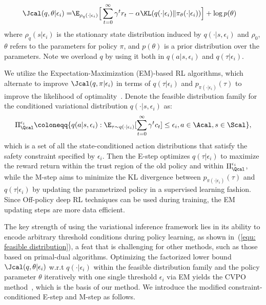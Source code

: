 \begin{equation}
\begin{split}
    \Jcal(q,\theta | \epsilon_i) =&
    \E_{\rho_q(\cdot |\epsilon_i)} \Big[ \sum_{t=0}^\infty \gamma^t r_t - \alpha\KL(q(\cdot | \epsilon_i) \Vert \pi_\theta(\cdot | \epsilon_i))\Big] + \log p(\theta)
\end{split}
\label{eq:elbo_new}
\end{equation}
where $\rho_q(s | \epsilon_i)$ is the stationary state distribution induced by $q(\cdot|s, \epsilon_i)$ and $\rho_0$, $\theta$ refers to the parameters for policy $\pi$, and $p(\theta)$ is a prior distribution over the parameters. Note we overload $q$ by using it both in $q(a|s, \epsilon_i)$ and $q(\tau | \epsilon_i)$.

We utilize the Expectation-Maximization (EM)-based RL algorithms, which alternate to improve $\Jcal(q,\pi | \epsilon_i)$ in terms of $q(\tau | \epsilon_i)$ and $p_{\pi(\cdot | \epsilon_i)}(\tau)$ to improve the likelihood of optimality~\cite{abdolmaleki2018maximum, abdolmaleki2018relative, liu2022constrained}. 
Denote the feasible distribution family for the conditioned variational distribution $q(\cdot | s, \epsilon_i)$  as: 
\begin{equation}
\label{equ: feasible distribution}
    \Pi_{\Qcal}^{\epsilon_i}\coloneqq \{q(a|s, \epsilon_i): \E_{\tau \sim q(\cdot | \epsilon_i)}[\sum_{t=0}^\infty \gamma^t c_t] \leq \epsilon_i, a \in \Acal, s \in \Scal\},
\end{equation}
which is a set of all the state-conditioned action distributions that satisfy the safety constraint specified by $\epsilon_i$.
Then the E-step optimizes $q(\tau | \epsilon_i)$ to maximize the reward return within the trust region of the old policy and within $\Pi_{\Qcal}^{\epsilon_i}$, while the M-step aims to minimize the KL divergence between $p_{\pi(\cdot | \epsilon_i)}(\tau)$ and $q(\tau | \epsilon_i)$ by updating the parametrized policy in a supervised learning fashion. 
Since Off-policy deep RL techniques can be used during training, the EM updating steps are more data efficient. 

The key strength of using the variational inference framework lies in its ability to encode arbitrary threshold conditions during policy learning, as shown in~(\ref{equ: feasible distribution}), a feat that is challenging for other methods, such as those based on primal-dual algorithms.
Optimizing the factorized lower bound $\Jcal(q,\theta | \epsilon_i)$ w.r.t $q(\cdot | \epsilon_i)$ within the feasible distribution family and the policy parameter $\theta$ iteratively with one single threshold $\epsilon_i$ via EM yields the CVPO method~\cite{liu2022constrained}, which is the basis of our method. We introduce the modified constraint-conditioned E-step and M-step as follows.

